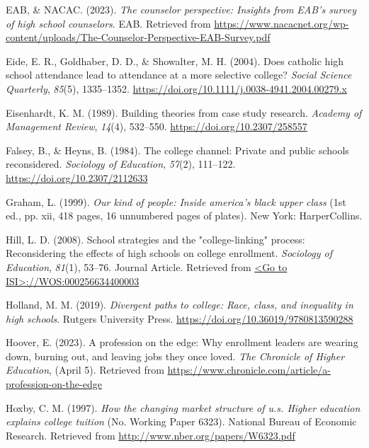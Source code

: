 \documentclass[
  12pt,
]{article}
\newlength{\cslhangindent}
\newenvironment{CSLReferences}[2] %
 {\begin{list}{}{%
  \setlength{\itemindent}{0pt}
  \setlength{\leftmargin}{0pt}
  \setlength{\parsep}{0pt}
  \ifodd #1
   \setlength{\leftmargin}{\cslhangindent}
   \setlength{\itemindent}{-1\cslhangindent}
  \fi
  \setlength{\itemsep}{#2\baselineskip}}}
 {\end{list}}
\begin{document}
\begin{CSLReferences}{1}{0}
EAB, \& NACAC. (2023). \emph{The counselor perspective: Insights from EAB's survey of high school counselors}. EAB. Retrieved from \url{https://www.nacacnet.org/wp-content/uploads/The-Counselor-Perspective-EAB-Survey.pdf}

Eide, E. R., Goldhaber, D. D., \& Showalter, M. H. (2004). Does catholic high school attendance lead to attendance at a more selective college? \emph{Social Science Quarterly}, \emph{85}(5), 1335--1352. \url{https://doi.org/10.1111/j.0038-4941.2004.00279.x}

Eisenhardt, K. M. (1989). Building theories from case study research. \emph{Academy of Management Review}, \emph{14}(4), 532--550. \url{https://doi.org/10.2307/258557}

Falsey, B., \& Heyns, B. (1984). The college channel: Private and public schools reconsidered. \emph{Sociology of Education}, \emph{57}(2), 111--122. \url{https://doi.org/10.2307/2112633}

Graham, L. (1999). \emph{Our kind of people: Inside america's black upper class} (1st ed., pp. xii, 418 pages, 16 unnumbered pages of plates). New York: HarperCollins.

Hill, L. D. (2008). School strategies and the "college-linking" process: Reconsidering the effects of high schools on college enrollment. \emph{Sociology of Education}, \emph{81}(1), 53--76. Journal Article. Retrieved from \href{\%3CGo\%20to\%20ISI\%3E://WOS:000256634400003}{\textless Go to ISI\textgreater://WOS:000256634400003}

Holland, M. M. (2019). \emph{Divergent paths to college: Race, class, and inequality in high schools}. Rutgers University Press. \url{https://doi.org/10.36019/9780813590288}

Hoover, E. (2023). A profession on the edge: Why enrollment leaders are wearing down, burning out, and leaving jobs they once loved. \emph{The Chronicle of Higher Education}, (April 5). Retrieved from \url{https://www.chronicle.com/article/a-profession-on-the-edge}

Hoxby, C. M. (1997). \emph{How the changing market structure of u.s. Higher education explains college tuition} (No. Working Paper 6323). National Bureau of Economic Research. Retrieved from \url{http://www.nber.org/papers/W6323.pdf}


\end{CSLReferences}
\end{document}
